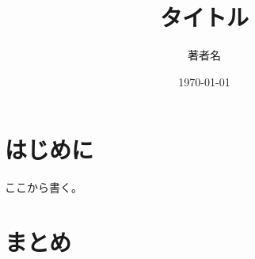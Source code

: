 \documentclass[a4paper,10pt]{jsarticle}
\title{タイトル}
\author{著者名}
\date{\today}
\begin{document}
\maketitle

\section{はじめに}
ここから書く。


\section{まとめ}

%
\end{document}

